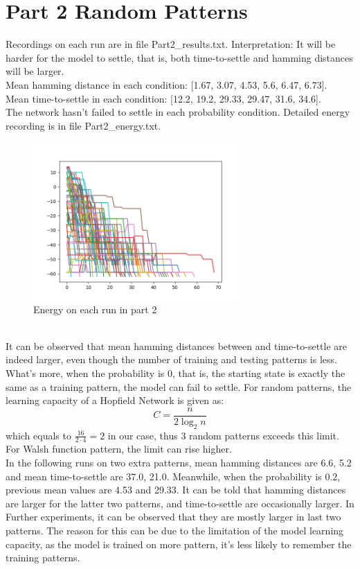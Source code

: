 \documentclass{article}
\begin{document}
\section*{Part 2 Random Patterns}
Recordings on each run are in file Part2\_results.txt. Interpretation: It will be harder for the model to settle, that is, both time-to-settle and hamming distances will be larger.\\
Mean hamming distance in each condition: [1.67, 3.07, 4.53, 5.6, 6.47, 6.73].\\
Mean time-to-settle in each condition: [12.2, 19.2, 29.33, 29.47, 31.6, 34.6].\\
The network hasn't failed to settle in each probability condition. Detailed energy recording is in file Part2\_energy.txt.\\
\begin{figure}[h]
    \centering
    \includegraphics[width=8cm]{Part2energy}
    \caption{Energy on each run in part 2}
\end{figure}\\
It can be observed that mean hamming distances between and time-to-settle are indeed larger, even though the number of training and testing patterns is less. What's more, when the probability is 0, that is, the starting state is exactly the same as a training pattern, the model can fail to settle. For random patterns, the learning capacity of a Hopfield Network is given as:
\[C = \frac{n}{2\log_2n}\]
which equals to $\frac{16}{2\cdot4} = 2$ in our case, thus 3 random patterns exceeds this limit. For Walsh function pattern, the limit can rise higher.\\
In the following runs on two extra patterns, mean hamming distances are 6.6, 5.2 and mean time-to-settle are 37.0, 21.0. Meanwhile, when the probability is 0.2, previous mean values are 4.53 and 29.33. It can be told that hamming distances are larger for the latter two patterns, and time-to-settle are occasionally larger. In Further experiments, it can be observed that they are mostly larger in last two patterns.
The reason for this can be due to the limitation of the model learning capacity, as the model is trained on more pattern, it's less likely to remember the training patterns.
\newpage
\end{document}
